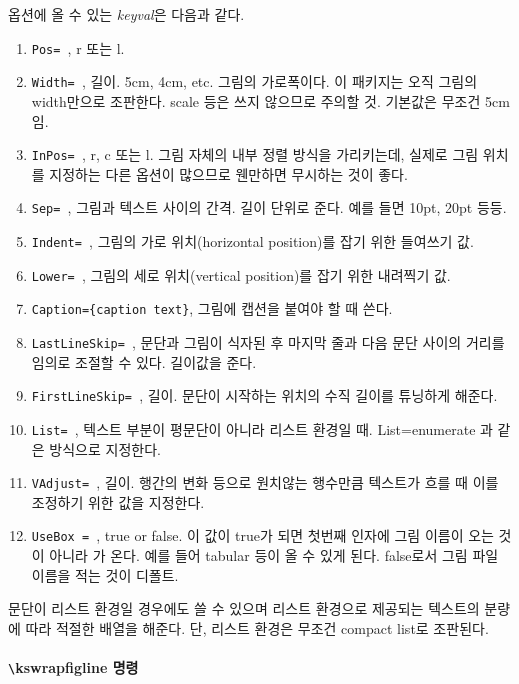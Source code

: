 \documentclass[a4paper,nanum]{oblivoir}
\begin{document}
\begin{boxedverbatim}
\end{boxedverbatim}

옵션에 올 수 있는 \textit{keyval}은 다음과 같다.
\begin{enumerate}\tightlist
\item \verb|Pos= |, r 또는 l.
\item \verb|Width= |, 길이. 5cm, 4cm, etc. 그림의 가로폭이다. 이 패키지는 오직 그림의 width만으로 조판한다. scale 등은 쓰지 않으므로 주의할 것. 기본값은 무조건 5cm임.
\item \verb|InPos= |, r, c 또는 l. 그림 자체의 내부 정렬 방식을 가리키는데, 실제로 그림 위치를 지정하는 다른 옵션이 많으므로 웬만하면 무시하는 것이 좋다.
\item \verb|Sep= |, 그림과 텍스트 사이의 간격. 길이 단위로 준다. 예를 들면 10pt, 20pt 등등.
\item \verb|Indent= |, 그림의 가로 위치(horizontal position)를 잡기 위한 들여쓰기 값. 
\item \verb|Lower= |, 그림의 세로 위치(vertical position)를 잡기 위한 내려찍기 값.
\item \verb|Caption={caption text}|, 그림에 캡션을 붙여야 할 때 쓴다.
\item \verb|LastLineSkip= |, 문단과 그림이 식자된 후 마지막 줄과 다음 문단 사이의 거리를 임의로 조절할 수 있다. 길이값을 준다.
\item \verb|FirstLineSkip= |, 길이. 문단이 시작하는 위치의 수직 길이를 튜닝하게 해준다.
\item \verb|List= |, 텍스트 부분이 평문단이 아니라 리스트 환경일 때. List=enumerate 과 같은 방식으로 지정한다.
\item \verb|VAdjust= |, 길이. 행간의 변화 등으로 원치않는 행수만큼 텍스트가 흐를 때 이를 조정하기 위한 값을 지정한다.
\item \verb|UseBox = |, true or false. 이 값이 true가 되면 첫번째 인자에 그림 이름이 오는 것이 아니라 가 온다. 예를 들어 tabular 등이 올 수 있게 된다. false로서 그림 파일 이름을 적는 것이 디폴트.
\end{enumerate}

문단이 리스트 환경일 경우에도 쓸 수 있으며 리스트 환경으로 제공되는 텍스트의 분량에 따라 적절한 배열을 해준다.
단, 리스트 환경은 무조건 compact list로 조판된다.

\paragraph{\texttt{\textbackslash}kswrapfigline 명령}
\end{document}
